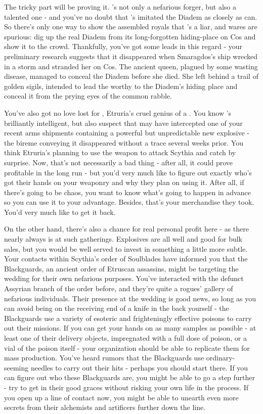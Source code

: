 \documentclass[char]{Kos}
\begin{document}
The tricky part will be proving it. \cMerchant{}'s not only a nefarious forger, but also a talented one - and you've no doubt that \cMerchant{\they}'s imitated the Diadem as closely as \cMerchant{\they} can. So there's only one way to show the assembled royals that \cMerchant{}'s a liar, and \cMerchant{\their} wares are spurious: dig up the real Diadem from its long-forgotten hiding-place on Cos and show it to the crowd. Thankfully, you've got some leads in this regard - your preliminary research suggests that it disappeared when Smaragdos's ship wrecked in a storm and stranded her on Cos. The ancient queen, plagued by some wasting disease, managed to conceal the Diadem before she died. She left behind a trail of golden sigils, intended to lead the worthy to the Diadem's hiding place and conceal it from the prying eyes of the common rabble.

You've also got no love lost for \cEtruriaKing{}, Etruria's cruel genius of a \cEtruriaKing{\monarch}. You know \cEtruriaKing{\they}'s brilliantly intelligent, but also suspect that \cEtruriaKing{\they} may have intercepted one of your recent arms shipments containing a powerful but unpredictable new explosive - the bireme conveying it disappeared without a trace several weeks prior. You think Etruria's planning to use the weapon to attack Scythia and catch \cScythiaKing{} by surprise. Now, that's not necessarily a bad thing - after all, it could prove profitable in the long run - but you'd very much like to figure out exactly who's got their hands on your weaponry and why they plan on using it. After all, if there's going to be chaos, you want to know what's going to happen in advance so you can use it to your advantage. Besides, that's your merchandise they took. You'd very much like to get it back.

On the other hand, there's also a chance for real personal profit here - as there nearly always is at such gatherings. Explosives are all well and good for bulk sales, but you would be well served to invest in something a little more subtle. Your contacts within Scythia's order of Soulblades have informed you that the Blackguards, an ancient order of Etruscan assassins, might be targeting the wedding for their own nefarious purposes. You've interacted with the defunct Assyrian branch of the order before, and they're quite a rogues' gallery of nefarious individuals. Their presence at the wedding is good news, so long as you can avoid being on the receiving end of a knife in the back yourself - the Blackguards use a variety of esoteric and frighteningly effective poisons to carry out their missions. If you can get your hands on as many samples as possible - at least one of their delivery objects, impregnated with a full dose of poison, or a vial of the poison itself - your organization should be able to replicate them for mass production. You've heard rumors that the Blackguards use ordinary-seeming needles to carry out their hits - perhaps you should start there. If you can figure out who these Blackguards are, you might be able to go a step further - try to get in their good graces without risking your own life in the process. If you open up a line of contact now, you might be able to unearth even more secrets from their alchemists and artificers further down the line.
\end{document}
